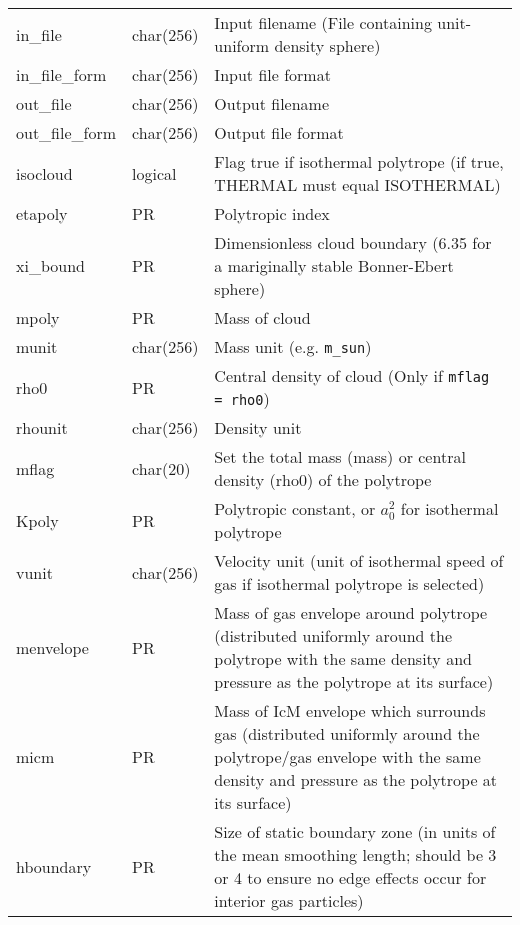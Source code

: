 \documentclass[a4paper]{article}
\newcommand{\var}[1]{\texttt{#1}}
\begin{document}
\begin{center}
\begin{supertabular}{|p{3cm}|p{2cm}|p{8cm}|}
in\_file         & char(256) & Input filename (File containing unit-uniform density sphere)\\
in\_file\_form   & char(256) & Input file format \\
out\_file        & char(256) & Output filename \\
out\_file\_form  & char(256) & Output file format \\
isocloud         & logical   & Flag true if isothermal polytrope (if true, THERMAL must equal ISOTHERMAL) \\
etapoly          & PR        & Polytropic index \\
xi\_bound        & PR        & Dimensionless cloud boundary (6.35 for a mariginally stable Bonner-Ebert sphere) \\
mpoly            & PR        & Mass of cloud \\
munit            & char(256)  & Mass unit (e.g. \var{m\_sun})\\
rho0             & PR        & Central density of cloud (Only if \var{mflag = rho0}) \\
rhounit          & char(256)  & Density unit \\
mflag            & char(20)  & Set the total mass (mass) or central density (rho0) of the polytrope \\
Kpoly            & PR        & Polytropic constant, or $a_0^2$ for isothermal polytrope \\
vunit            & char(256)  & Velocity unit (unit of isothermal speed of gas if isothermal polytrope is selected)\\
menvelope        & PR        & Mass of gas envelope around polytrope (distributed uniformly around the polytrope with the same density and pressure as the polytrope at its surface)\\
micm             & PR        & Mass of IcM envelope which surrounds gas (distributed uniformly around the polytrope/gas envelope with the same density and pressure as the polytrope at its surface)\\
hboundary        & PR        & Size of static boundary zone (in units of the mean smoothing length; should be 3 or 4 to ensure no edge effects occur for interior gas particles) \\
\end{supertabular}
\end{center}
\end{document}
